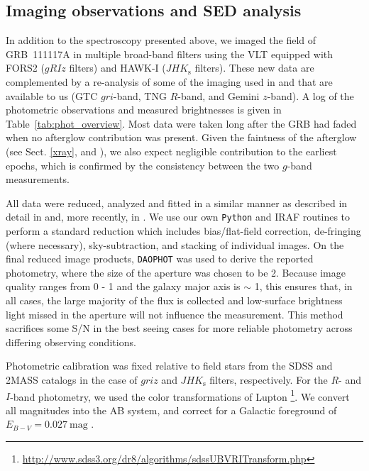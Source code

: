 \documentclass{aa}    %
\begin{document}
\subsection{Imaging observations and SED analysis} \label{SED}

In addition to the spectroscopy presented above, we imaged the field of
GRB~111117A in multiple broad-band filters using the VLT equipped with FORS2
($gRIz$ filters) and HAWK-I ($JHK_{\mathrm{s}}$ filters). These new data are
complemented by a re-analysis of some of the imaging used in
\citet{Margutti2012} and \citet{Sakamoto2013} that are available to us (GTC
$gri$-band, TNG $R$-band, and Gemini $z$-band). A log of the photometric
observations and measured brightnesses is given in
Table~\ref{tab:phot_overview}. Most data were taken long after the GRB had faded
when no afterglow contribution was present. Given the faintness of the afterglow
(see Sect. \ref{xray}, and \citealt{Cucchiara2011, Cenko2011}), we also expect
negligible contribution to the earliest epochs, which is confirmed by the
consistency between the two $g$-band measurements.

All data were reduced, analyzed and fitted in a similar manner as described in
detail in \citet{Kruhler2011a} and, more recently, in \citet{Schulze2016}. We
use our own \texttt{Python} and IRAF routines to perform a standard reduction
which includes bias/flat-field correction, de-fringing (where necessary),
sky-subtraction, and stacking of individual images. On the final reduced image
products, \texttt{DAOPHOT} \citep{Stetson1987} was used to derive the reported
photometry, where the size of the aperture was chosen to be 2. Because
image quality ranges from 0 - 1 and the galaxy major axis is $\sim$
1\farc, this ensures that, in all cases, the large majority of the flux is
collected and low-surface brightness light missed in the aperture will not
influence the measurement. This method sacrifices some S/N in the best seeing
cases for more reliable photometry across differing observing conditions.

Photometric calibration was fixed relative to field stars from the SDSS and
2MASS catalogs in the case of $griz$ and $JHK_{\mathrm{s}}$ filters,
respectively. For the $R$- and $I$-band photometry, we used the color
transformations of Lupton%
\footnote{\url{http://www.sdss3.org/dr8/algorithms/sdssUBVRITransform.php}}. We
convert all magnitudes into the AB system, and correct for a Galactic foreground
of $E_{B-V}=0.027~\mathrm{mag}$ \citep{Schlegel1998, Schlafly2011}.
\end{document}

